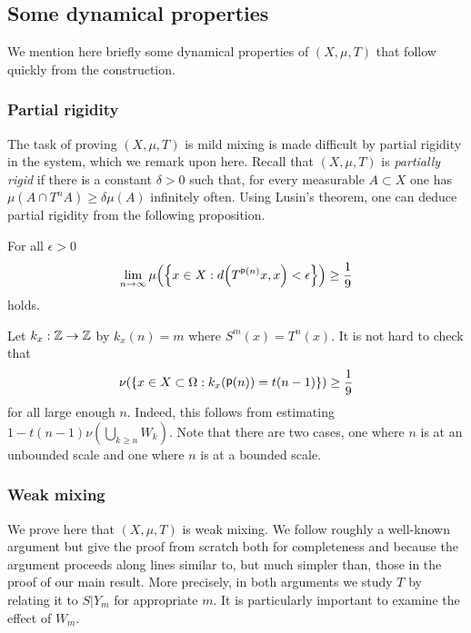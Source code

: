 \documentclass[10pt]{amsart}
\theoremstyle{definition}\newtheorem{defi}[theo]{Definition}\newtheorem{rema}[theo]{Remark}\newtheorem{exam}[theo]{Example}\newtheorem{exem}[theo]{Example}\newtheorem{nota}[theo]{Notation}
\DeclareMathOperator{\p}{\mathsf{p}}
\newcommand{\Z}{\mathbb{Z}}
\let\originalleft\left
\let\originalright\right
\renewcommand{\left}{\mathopen{}\mathclose\bgroup\originalleft}
\renewcommand{\right}{\aftergroup\egroup\originalright}
\renewcommand*{\to}{\mathchoice{\longrightarrow}{\rightarrow}{\rightarrow}{\rightarrow}}
\begin{document}
\subsection{Some dynamical properties}

We mention here briefly some dynamical properties of $(X,\mu,T)$ that follow quickly from the construction.

\subsubsection{Partial rigidity} The task of proving $(X,\mu,T)$ is mild mixing is made difficult by partial rigidity in the system, which we remark upon here. Recall that $(X,\mu,T)$ is
\emph{partially rigid} if there is a constant $\delta > 0$ such that, for every measurable $A \subset X$ one has $\mu(A \cap T^n A) \ge \delta \mu(A)$ infinitely often. Using Lusin's theorem, one can deduce partial rigidity from the following proposition.

\begin{prop}
For all $\epsilon>0$
\[
\lim_{n \to \infty} \mu\left(\left\{x\in X: d\left(T^{\p(n)}x,x\right)<\epsilon\right\}\right)\geq \frac{1}{9}
\]
holds.
\end{prop}

Let $k_x:\Z \to \Z$ by $k_x(n)=m$ where $S^m(x) = T^{n}(x)$. It is not hard to check that
\[
\nu\left(\left\{x \in X\subset \Omega:k_x(\p(n))=t(n-1)\right\}\right)\geq \frac{1}{9}
\]
for all large enough $n$. Indeed, this follows from estimating $1-t(n-1)\nu(\bigcup_{k\geq n}W_k).$ Note that there are two cases, one where $n$ is at an unbounded scale and one where $n$ is at a bounded scale.


\subsubsection{Weak mixing}\label{subsec:weak_mixing}
We prove here that $(X,\mu,T)$ is weak mixing. We follow roughly a well-known argument but give the proof from scratch both for completeness and because the argument proceeds along lines similar to, but much simpler than, those in the proof of our main result. More precisely, in both arguments we study $T$ by relating it to $S|Y_m$ for appropriate $m$. It is particularly important to examine the effect of $W_m$.
\end{document}
